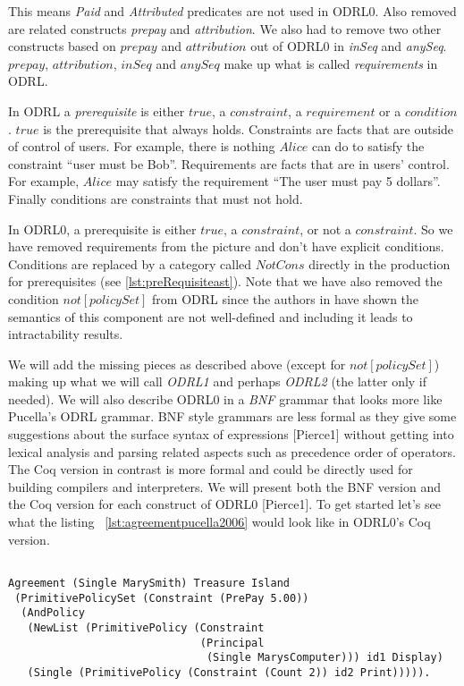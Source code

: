 This means \emph{Paid} and \emph{Attributed} predicates are not used in ODRL0. Also removed are related constructs \emph{prepay} and \emph{attribution}. We also had to remove two other constructs based on $prepay$ and $attribution$ out of ODRL0 in \emph{inSeq} and \emph{anySeq}. $prepay$, $attribution$, $inSeq$ and $anySeq$ make up what is called \emph{requirements} in ODRL.

In ODRL a \emph{prerequisite} is either $true$, a $constraint$, a $requirement$ or a $condition$. $true$ is the prerequisite that always holds. Constraints are facts that are outside of control of users. For example, there is nothing $Alice$ can do to satisfy the constraint ``user must be Bob''. Requirements are facts that are in users' control. For example, $Alice$ may satisfy the requirement ``The user must pay 5 dollars''. Finally conditions are constraints that must not hold.

In ODRL0, a prerequisite is either $true$, a $constraint$, or not a $constraint$. So we have removed requirements from the picture and don't have explicit conditions. Conditions are replaced by a category called $NotCons$ directly in the production for prerequisites (see \ref{lst:preRequisiteast}). Note that we have also removed the condition $not[policySet]$ from ODRL since the authors in \cite{pucella2006} have shown the semantics of this component are not well-defined and including it leads to intractability results.

We will add the missing pieces as described above (except for $not[policySet]$) making up what we will call \emph{ODRL1} and perhaps \emph{ODRL2} (the latter only if needed). We will also describe ODRL0 in a \emph{BNF} grammar that looks more like Pucella's ODRL grammar. BNF style grammars are less formal as they give some suggestions about the surface syntax of expressions [Pierce1] without getting into lexical analysis and parsing related aspects such as precedence order of operators. The Coq version in contrast is more formal and could be directly used for building compilers and interpreters. We will present both the BNF version and the Coq version for each construct of ODRL0 [Pierce1]. To get started let's see what the listing ~\ref{lst:agreementpucella2006} would look like in ODRL0's Coq version.

\lstset{language=Coq}
\begin{lstlisting}[frame=single, caption={Coq version of agreement for Mary Smith},label={lst:marysmithagreementcoq}]

Agreement (Single MarySmith) Treasure Island 
 (PrimitivePolicySet (Constraint (PrePay 5.00))
  (AndPolicy 
   (NewList (PrimitivePolicy (Constraint 
                              (Principal 
                               (Single MarysComputer))) id1 Display)
   (Single (PrimitivePolicy (Constraint (Count 2)) id2 Print))))).
\end{lstlisting}


